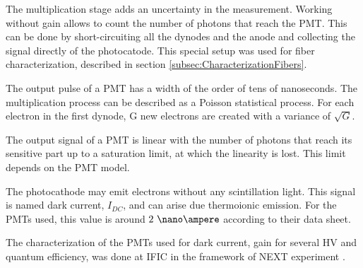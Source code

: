 \begin{enumerate}
The multiplication stage adds an uncertainty in the measurement. Working without gain allows to count the number of photons that reach the PMT. This can be done by short-circuiting all the dynodes and the anode and collecting the signal directly of the photocatode. This special setup was used for fiber characterization, described in section \ref{subsec:CharacterizationFibers}.


\end{enumerate}

The output pulse of a PMT has a width of the order of tens of nanoseconds. The multiplication process can be described as a Poisson statistical process. For each electron in the first dynode, G new electrons are created with a variance of $\sqrt{G}$.

The output signal of a PMT is linear with the number of photons that reach its sensitive part up to a saturation limit, at which the linearity is lost. This limit depends on the PMT model.

The photocathode may emit electrons without any scintillation light. This signal is named dark current, $I_{DC}$, and can  arise due thermoionic emission. For the PMTs used, this value is around $2~\nano\ampere$ according to their data sheet.

The characterization of the PMTs used for dark current, gain for several HV and quantum efficiency,  was done at IFIC in the framework of NEXT experiment \cite{CalibrationPMTsNEXT}. 